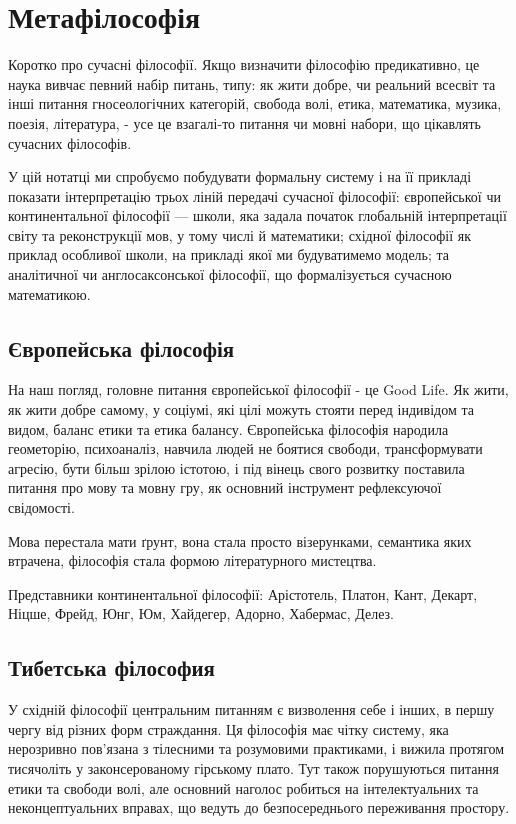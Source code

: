 \section{Метафілософія}

Коротко про сучасні філософії. Якщо визначити філософію предикативно,
це наука вивчає певний набір питань, типу: як жити добре, чи реальний
всесвіт та інші питання гносеологічних категорій, свобода волі, етика,
математика, музика, поезія, література, - усе це взагалі-то питання
чи мовні набори, що цікавлять сучасних філософів.

У цій нотатці ми спробуємо побудувати формальну систему і на її
прикладі показати інтерпретацію трьох ліній передачі сучасної філософії:
європейської чи континентальної філософії --- школи, яка задала початок
глобальній інтерпретації світу та реконструкції мов, у тому числі й
математики; східної філософії як приклад особливої школи, на прикладі
якої ми будуватимемо модель; та аналітичної чи англосаксонської
філософії, що формалізується сучасною математикою.

\subsection*{Європейська філософія}

На наш погляд, головне питання європейської філософії - це Good Life.
Як жити, як жити добре самому, у соціумі, які цілі можуть стояти перед
індивідом та видом, баланс етики та етика балансу. Європейська філософія
народила геометорію, психоаналіз, навчила людей не боятися свободи,
трансформувати агресію, бути більш зрілою істотою, і під вінець свого
розвитку поставила питання про мову та мовну гру, як основний інструмент
рефлексуючої свідомості.

Мова перестала мати ґрунт, вона стала просто візерунками, семантика
яких втрачена, філософія стала формою літературного мистецтва.

Представники континентальної філософії: Арістотель, Платон, Кант,
Декарт, Ніцше, Фрейд, Юнг, Юм, Хайдегер, Адорно, Хабермас, Делез.

\subsection*{Тибетська філософия}

У східній філософії центральним питанням є визволення себе і інших,
в першу чергу від різних форм страждання. Ця філософія має чітку
систему, яка нерозривно пов'язана з тілесними та розумовими практиками,
і вижила протягом тисячоліть у законсерованому гірському плато.
Тут також порушуються питання етики та свободи волі, але основний
наголос робиться на інтелектуальних та неконцептуальних вправах,
що ведуть до безпосереднього переживання простору.

